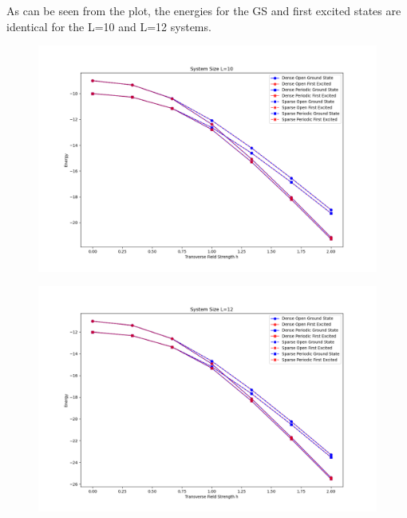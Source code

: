 \documentclass[12pt]{article}
\begin{document}
\subsubsection{}
As can be seen from the plot, the energies for the GS and first excited states are identical for the L=10 and L=12 systems.
\begin{figure}
\centering
\includegraphics[width=\textwidth]{enhanced_compare_ising_model_L10.png}
\end{figure}

\begin{figure}
\centering
\includegraphics[width=\textwidth]{enhanced_compare_ising_model_L12.png}
\end{figure}
\end{document}
